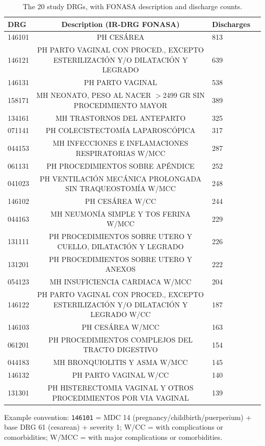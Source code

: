 \documentclass{ieeeaccess}
\begin{document}
\begin{table}[!t]
\caption{The 20 study DRGs, with FONASA description and discharge counts.}
\label{tab:grd}
\scriptsize
\begin{tabular}{lclr}
\hline
\textbf{DRG} & \textbf{Description (IR-DRG FONASA)} & \textbf{Discharges} \\
\hline
146101 & PH CES\'AREA & 813 \\
146121 & PH PARTO VAGINAL CON PROCED., EXCEPTO ESTERILIZACI\'ON Y/O DILATACI\'ON Y LEGRADO & 639 \\
146131 & PH PARTO VAGINAL & 538 \\
158171 & MH NEONATO, PESO AL NACER $>$2499 GR SIN PROCEDIMIENTO MAYOR & 389 \\
134161 & MH TRASTORNOS DEL ANTEPARTO & 325 \\
071141 & PH COLECISTECTOM\'IA LAPAROSC\'OPICA & 317 \\
044153 & MH INFECCIONES E INFLAMACIONES RESPIRATORIAS W/MCC & 287 \\
061131 & PH PROCEDIMIENTOS SOBRE AP\'ENDICE & 252 \\
041023 & PH VENTILACI\'ON MEC\'ANICA PROLONGADA SIN TRAQUEOSTOM\'IA W/MCC & 248 \\
146102 & PH CES\'AREA W/CC & 244 \\
044163 & MH NEUMON\'IA SIMPLE Y TOS FERINA W/MCC & 229 \\
131111 & PH PROCEDIMIENTOS SOBRE UTERO Y CUELLO, DILATACI\'ON Y LEGRADO & 226 \\
131201 & PH PROCEDIMIENTOS SOBRE UTERO Y ANEXOS & 222 \\
054123 & MH INSUFICIENCIA CARDIACA W/MCC & 204 \\
146122 & PH PARTO VAGINAL CON PROCED., EXCEPTO ESTERILIZACI\'ON Y/O DILATACI\'ON Y LEGRADO W/CC & 187 \\
146103 & PH CES\'AREA W/MCC & 163 \\
061201 & PH PROCEDIMIENTOS COMPLEJOS DEL TRACTO DIGESTIVO & 154 \\
044183 & MH BRONQUIOLITIS Y ASMA W/MCC & 145 \\
146132 & PH PARTO VAGINAL W/CC & 140 \\
131301 & PH HISTERECTOMIA VAGINAL Y OTROS PROCEDIMIENTOS POR VIA VAGINAL & 139 \\
\hline
\end{tabular}
\vspace{2pt}
\begin{minipage}{\linewidth}\footnotesize Example convention: \texttt{146101} = MDC 14 (pregnancy/childbirth/puerperium) + base DRG 61 (cesarean) + severity 1; W/CC = with complications or comorbidities; W/MCC = with major complications or comorbidities.\end{minipage}
\end{table}
\end{document}
